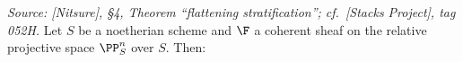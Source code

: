 \begin{theorem}

  \label{thm:flattening_stratification_exists}

  \textit{Source: [Nitsure], \S4, Theorem ``flattening stratification'';
  cf.\ [Stacks Project], tag 052H.}
  Let \(S\) be a noetherian scheme and \(\F\) a coherent sheaf on the relative
  projective space \(\PP^n_S\) over \(S\).  Then:
  \begin{enumerate}[label=(\roman*)]

\end{enumerate}
\end{theorem}
